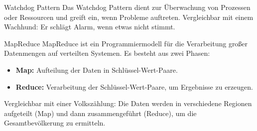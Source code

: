 \documentclass{beamer}
\begin{document}
\begin{frame}{Watchdog Pattern}
    Das Watchdog Pattern dient zur Überwachung von Prozessen oder Ressourcen und greift ein, wenn Probleme auftreten. Vergleichbar mit einem Wachhund: Er schlägt Alarm, wenn etwas nicht stimmt.
\end{frame}


\begin{frame}{MapReduce}
    MapReduce ist ein Programmiermodell für die Verarbeitung großer Datenmengen auf verteilten Systemen. Es besteht aus zwei Phasen:
    \begin{itemize}
        \item \textbf{Map:} Aufteilung der Daten in Schlüssel-Wert-Paare.
        \item \textbf{Reduce:} Verarbeitung der Schlüssel-Wert-Paare, um Ergebnisse zu erzeugen.
    \end{itemize}
    Vergleichbar mit einer Volkszählung: Die Daten werden in verschiedene Regionen aufgeteilt (Map) und dann zusammengeführt (Reduce), um die Gesamtbevölkerung zu ermitteln.
\end{frame}
\end{document}
